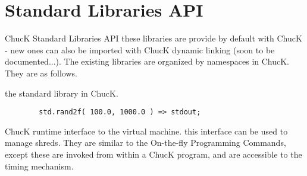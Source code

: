 \chapter{Standard Libraries API}

ChucK Standard Libraries API 
these libraries are provide by default with ChucK - new ones can also be 
imported with ChucK dynamic linking (soon to be documented...). 
The existing libraries are organized by namespaces in ChucK. 
They are as follows. 



the standard library in ChucK. \\
\example

\begin{verbatim}
        std.rand2f( 100.0, 1000.0 ) => stdout;
\end{verbatim}




































ChucK runtime interface to the virtual machine. this interface can be used to manage shreds. 
They are similar to the On-the-fly Programming Commands, except these are invoked from 
within a ChucK program, and are accessible to the timing mechanism. 

